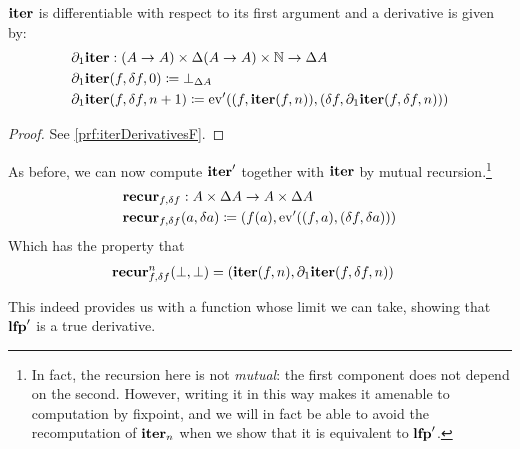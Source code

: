\begin{prop}[name=Derivative of the iteration map with respect to $f$, restate=iterDerivativesF]
  \label{prop:iterDerivativesF}
  $\mathbf{iter}$ is differentiable with respect to its first argument and a derivative is given by:
  \begin{align*}
    &\partial_1{\mathbf{iter}} : (A \rightarrow A) \times \Delta (A \rightarrow A) \times \mathbb{N} \rightarrow \Delta A\\
    &\partial_1{\mathbf{iter}} (f, \delta f, 0) \coloneqq \bot_{\Delta A}\\
    &\partial_1{\mathbf{iter}} (f, \delta f, n + 1) \coloneqq \operatorname{ev}'((f, \mathbf{iter}(f, n)), (\delta f, \partial_1{\mathbf{iter}}(f, \delta f, n)))
  \end{align*}
\end{prop}
\ifproofs
\begin{proof}
  See \cref{prf:iterDerivativesF}.
\end{proof}
\fi

As before, we can now compute $\mathbf{iter}'$ together with $\mathbf{iter}$ by
mutual recursion.\footnote{
  In fact, the recursion here is not \emph{mutual}: the first component does not
  depend on the second. However, writing it in this way makes it
  amenable to computation by fixpoint, and we will in fact be able to avoid the
  recomputation of $\mathbf{iter}_n$ when we show that it is equivalent to $\mathbf{lfp}'$.
}
\begin{align*}
  &\mathbf{recur}_{f, \delta f} : A \times \Delta A \rightarrow A \times \Delta A\\
  &\mathbf{recur}_{f, \delta f} (a, \delta a) \coloneqq (f(a), \operatorname{ev}'((f, a), (\delta f, \delta a)))
\end{align*}
Which has the property that
\begin{align*}
  &\mathbf{recur}_{f, \delta f}^n (\bot, \bot) = (\mathbf{iter}(f, n), \partial_1{\mathbf{iter}}(f, \delta f, n))
\end{align*}

This indeed provides us with a function whose limit we can take, showing
that $\mathbf{lfp}'$ is a true derivative.


